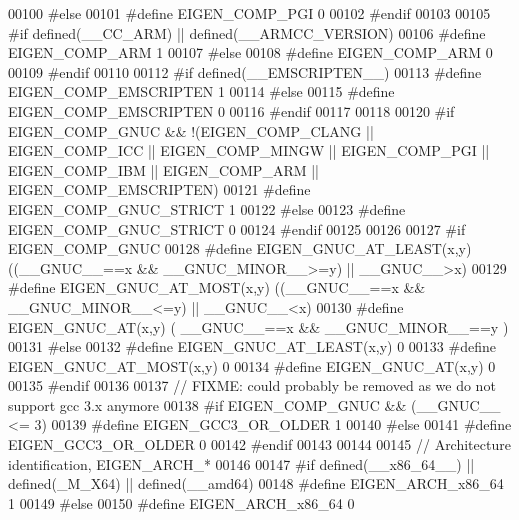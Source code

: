 \begin{DoxyCode}
00100 \textcolor{preprocessor}{#else}
00101 \textcolor{preprocessor}{  #define EIGEN\_COMP\_PGI 0}
00102 \textcolor{preprocessor}{#endif}
00103 
00105 \textcolor{preprocessor}{#if defined(\_\_CC\_ARM) || defined(\_\_ARMCC\_VERSION)}
00106 \textcolor{preprocessor}{  #define EIGEN\_COMP\_ARM 1}
00107 \textcolor{preprocessor}{#else}
00108 \textcolor{preprocessor}{  #define EIGEN\_COMP\_ARM 0}
00109 \textcolor{preprocessor}{#endif}
00110 
00112 \textcolor{preprocessor}{#if defined(\_\_EMSCRIPTEN\_\_)}
00113 \textcolor{preprocessor}{  #define EIGEN\_COMP\_EMSCRIPTEN 1}
00114 \textcolor{preprocessor}{#else}
00115 \textcolor{preprocessor}{  #define EIGEN\_COMP\_EMSCRIPTEN 0}
00116 \textcolor{preprocessor}{#endif}
00117 
00118 
00120 \textcolor{preprocessor}{#if EIGEN\_COMP\_GNUC && !(EIGEN\_COMP\_CLANG || EIGEN\_COMP\_ICC || EIGEN\_COMP\_MINGW || EIGEN\_COMP\_PGI ||
       EIGEN\_COMP\_IBM || EIGEN\_COMP\_ARM || EIGEN\_COMP\_EMSCRIPTEN)}
00121 \textcolor{preprocessor}{  #define EIGEN\_COMP\_GNUC\_STRICT 1}
00122 \textcolor{preprocessor}{#else}
00123 \textcolor{preprocessor}{  #define EIGEN\_COMP\_GNUC\_STRICT 0}
00124 \textcolor{preprocessor}{#endif}
00125 
00126 
00127 \textcolor{preprocessor}{#if EIGEN\_COMP\_GNUC}
00128 \textcolor{preprocessor}{  #define EIGEN\_GNUC\_AT\_LEAST(x,y) ((\_\_GNUC\_\_==x && \_\_GNUC\_MINOR\_\_>=y) || \_\_GNUC\_\_>x)}
00129 \textcolor{preprocessor}{  #define EIGEN\_GNUC\_AT\_MOST(x,y)  ((\_\_GNUC\_\_==x && \_\_GNUC\_MINOR\_\_<=y) || \_\_GNUC\_\_<x)}
00130 \textcolor{preprocessor}{  #define EIGEN\_GNUC\_AT(x,y)       ( \_\_GNUC\_\_==x && \_\_GNUC\_MINOR\_\_==y )}
00131 \textcolor{preprocessor}{#else}
00132 \textcolor{preprocessor}{  #define EIGEN\_GNUC\_AT\_LEAST(x,y) 0}
00133 \textcolor{preprocessor}{  #define EIGEN\_GNUC\_AT\_MOST(x,y)  0}
00134 \textcolor{preprocessor}{  #define EIGEN\_GNUC\_AT(x,y)       0}
00135 \textcolor{preprocessor}{#endif}
00136 
00137 \textcolor{comment}{// FIXME: could probably be removed as we do not support gcc 3.x anymore}
00138 \textcolor{preprocessor}{#if EIGEN\_COMP\_GNUC && (\_\_GNUC\_\_ <= 3)}
00139 \textcolor{preprocessor}{#define EIGEN\_GCC3\_OR\_OLDER 1}
00140 \textcolor{preprocessor}{#else}
00141 \textcolor{preprocessor}{#define EIGEN\_GCC3\_OR\_OLDER 0}
00142 \textcolor{preprocessor}{#endif}
00143 
00144 
00145 \textcolor{comment}{// Architecture identification, EIGEN\_ARCH\_*}
00146 
00147 \textcolor{preprocessor}{#if defined(\_\_x86\_64\_\_) || defined(\_M\_X64) || defined(\_\_amd64)}
00148 \textcolor{preprocessor}{  #define EIGEN\_ARCH\_x86\_64 1}
00149 \textcolor{preprocessor}{#else}
00150 \textcolor{preprocessor}{  #define EIGEN\_ARCH\_x86\_64 0}

\end{DoxyCode}
